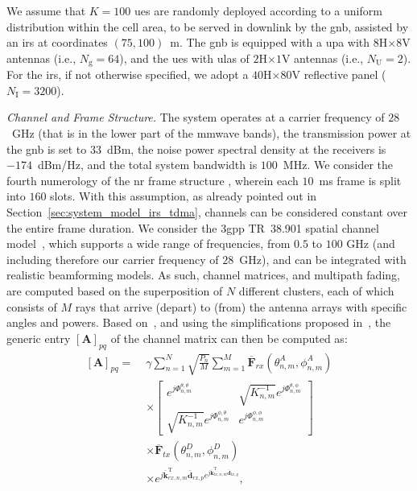 We assume that $K=100$ \glspl{ue} are randomly deployed according to a uniform distribution within the cell area, to be served in downlink by the \gls{gnb}, assisted by an \gls{irs} at coordinates $(75, 100)$~m. 
The \gls{gnb} is equipped with a \gls{upa} with $8$H$\times8$V antennas (i.e., $N_{\mathrm g}=64$), and the \glspl{ue} with \glspl{ula} of $2$H$\times1$V antennas (i.e., $N_{\mathrm U} = 2$). 
For the \gls{irs}, if not otherwise specified, we adopt a $40$H$\times80$V reflective panel ($N_{\mathrm I}= 3200$).

\emph{Channel and Frame Structure.}
The system operates at a carrier frequency of $28$~GHz (that is in the lower part of the \gls{mmwave} bands), the transmission power at the \gls{gnb} is set to $33$~dBm, the noise power spectral density at the receivers is $-174$~dBm/Hz, and the total system bandwidth is $100$~MHz. We consider the fourth numerology of the \gls{nr} frame structure \cite{3gpp.38.211}, wherein each $10$~ms frame is split into $160$ slots. With this assumption, as already pointed out in Section~\ref{sec:system_model_irs_tdma}, channels can be considered constant over the entire frame duration.
We consider the \gls{3gpp} TR~38.901 spatial channel model~\cite{3gpp.38.901}, which supports a wide range of frequencies, from $0.5$ to $100$ GHz (and including therefore our carrier frequency of $28$~GHz), and can be integrated with realistic beamforming models.
As such, channel matrices, and multipath fading, are computed based on the superposition of $N$ different clusters, each of which consists of $M$ rays that arrive (depart) to (from) the antenna arrays with specific angles and powers.
Based on~\cite{3gpp.38.901}, and using the simplifications proposed in~\cite{zugno20implementation}, the generic entry $[\bm{A}]_{pq}$ of the channel matrix can then be computed as:
\begin{equation}
\label{eq:ch_model_full}
\begin{aligned}
[\bm{A}]_{pq} = \; &\gamma \sum_{n=1}^{N} \sqrt{\frac{P_{n}}{M}} \sum_{m=1}^{M} \overline{\mathbf{F}}_{r x}\left(\theta_{n, m}^{A}, \phi_{n, m}^{A}\right) \\
& \times\left[\begin{array}{cr}
e^{j \Phi_{n, m}^{\theta, \theta}} & \sqrt{K_{n, m}^{-1}} e^{j \Phi_{n, m}^{\theta, \phi}} \\
\sqrt{K_{n, m}^{-1}} e^{j \Phi_{n, m}^{\phi, \theta}} & e^{j \Phi_{n, m}^{\phi, \phi}}
\end{array}\right] \\
& \times \overline{\mathbf{F}}_{tx}\left(\theta_{n, m}^{D}, \phi_{n, m}^{D}\right) \\
& \times e^{j \overline{\mathbf{k}}_{rx, n, m}^{\mathrm T} \overline{\mathbf{d}}_{rx, p} e^{j \overline{\mathbf{k}}_{tx, n, m}^{\mathrm T} \overline{\mathbf{d}}_{tx, q}}},
\end{aligned}
\end{equation}
